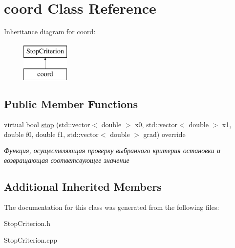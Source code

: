 \hypertarget{classcoord}{}\section{coord Class Reference}
\label{classcoord}
Inheritance diagram for coord\+:\begin{figure}[H]
\begin{center}
\leavevmode
\includegraphics[height=2.000000cm]{classcoord}
\end{center}
\end{figure}
\subsection*{Public Member Functions}
\begin{DoxyCompactItemize}
\item 
\mbox{\label{classcoord_a7a339b16b6173691c9fd8d6b7485144f}} 
virtual bool \mbox{\hyperlink{classcoord_a7a339b16b6173691c9fd8d6b7485144f}{stop}} (std\+::vector$<$ double $>$ x0, std\+::vector$<$ double $>$ x1, double f0, double f1, std\+::vector$<$ double $>$ grad) override
\begin{DoxyCompactList}\small\item\em Функция, осуществляющая проверку выбранного критерия остановки и возвращающая соответсвующее значение \end{DoxyCompactList}\end{DoxyCompactItemize}
\subsection*{Additional Inherited Members}


The documentation for this class was generated from the following files\+:\begin{DoxyCompactItemize}
\item 
Stop\+Criterion.\+h\item 
Stop\+Criterion.\+cpp\end{DoxyCompactItemize}
